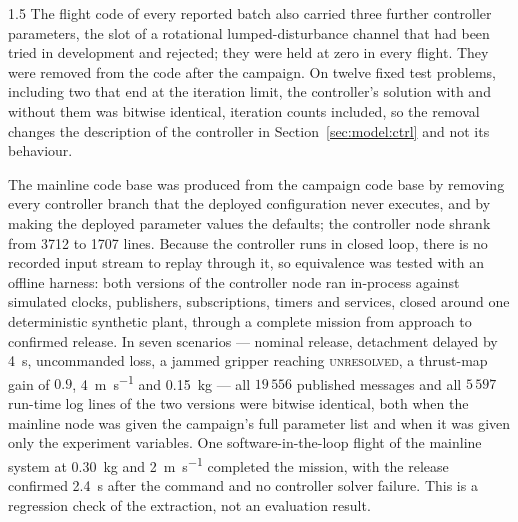 \begin{spacing}{1.5}
The flight code of every reported batch also carried three further controller
parameters, the slot of a rotational lumped-disturbance channel that had been
tried in development and rejected; they were held at zero in every flight. They
were removed from the code after the campaign. On twelve fixed test problems,
including two that end at the iteration limit, the controller's solution with
and without them was bitwise identical, iteration counts included, so the
removal changes the description of the controller in
Section~\ref{sec:model:ctrl} and not its behaviour.

The mainline code base was produced from the campaign code base by removing
every controller branch that the deployed configuration never executes, and by
making the deployed parameter values the defaults; the controller node shrank
from 3712 to 1707 lines. Because the controller runs in closed loop, there is no
recorded input stream to replay through it, so equivalence was tested with an
offline harness: both versions of the controller node ran in-process against
simulated clocks, publishers, subscriptions, timers and services, closed around
one deterministic synthetic plant, through a complete mission from approach to
confirmed release. In seven scenarios --- nominal release, detachment delayed by
\SI{4}{\second}, uncommanded loss, a jammed gripper reaching
\textsc{unresolved}, a thrust-map gain of $0.9$, \SI{4}{\meter\per\second} and
\SI{0.15}{\kg} --- all $19\,556$ published messages and all $5\,597$ run-time log
lines of the two versions were bitwise identical, both when the mainline node was
given the campaign's full parameter list and when it was given only the
experiment variables. One software-in-the-loop flight of the mainline system at
\SI{0.30}{\kg} and \SI{2}{\meter\per\second} completed the mission, with the
release confirmed \SI{2.4}{\second} after the command and no controller solver
failure. This is a regression check of the extraction, not an evaluation result.


\end{spacing}
